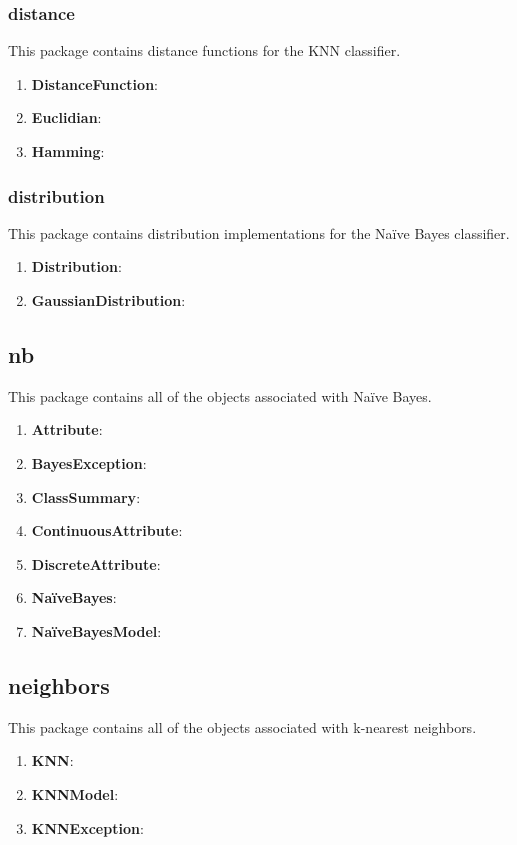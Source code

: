 \documentclass[11pt]{article}
\newcommand{\bb}{\textbf}
\begin{document}
\subsubsection{distance}
This package contains distance functions for the KNN classifier.

\begin{enumerate}[leftmargin=*]
  \item[] \bb{DistanceFunction}:
  \item[] \bb{Euclidian}:
  \item[] \bb{Hamming}:
\end{enumerate}

\subsubsection{distribution}
This package contains distribution implementations for the Naïve Bayes classifier.

\begin{enumerate}[leftmargin=*]
  \item[] \bb{Distribution}:
  \item[] \bb{GaussianDistribution}:
\end{enumerate}

\subsection{nb}
This package contains all of the objects associated with Naïve Bayes.

\begin{enumerate}[leftmargin=*]
  \item[] \bb{Attribute}:
  \item[] \bb{BayesException}:
  \item[] \bb{ClassSummary}:
  \item[] \bb{ContinuousAttribute}:
  \item[] \bb{DiscreteAttribute}:
  \item[] \bb{NaïveBayes}:
  \item[] \bb{NaïveBayesModel}:
\end{enumerate}

\subsection{neighbors}
This package contains all of the objects associated with k-nearest neighbors.

\begin{enumerate}[leftmargin=*]
  \item[] \bb{KNN}:
  \item[] \bb{KNNModel}:
  \item[] \bb{KNNException}:
\end{enumerate}
\end{document}
